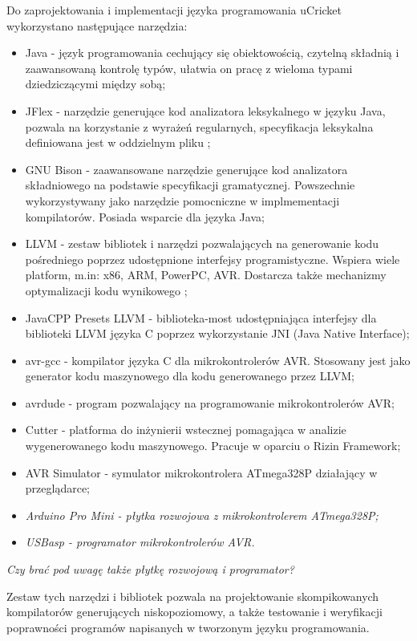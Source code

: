 Do zaprojektowania i implementacji języka programowania uCricket wykorzystano następujące narzędzia:
\begin{itemize}
\item Java - \ksremark{--} język programowania cechujący się obiektowością, czytelną składnią i zaawansowaną kontrolę typów, ułatwia on pracę z wieloma typami dziedziczącymi między sobą;
\item JFlex - narzędzie generujące kod analizatora leksykalnego w języku Java, pozwala na korzystanie z wyrażeń regularnych, specyfikacja leksykalna definiowana jest w oddzielnym pliku \cytowanie;
\item GNU Bison - zaawansowane narzędzie generujące kod analizatora składniowego na podstawie specyfikacji gramatycznej. Powszechnie wykorzystywany jako narzędzie pomocniczne w implmementacji kompilatorów. Posiada wsparcie dla języka Java;
\item LLVM - zestaw bibliotek i narzędzi pozwalających na generowanie kodu pośredniego poprzez udostępnione interfejsy programistyczne. Wspiera wiele platform, m.in: x86, ARM, PowerPC, AVR. Dostarcza także mechanizmy optymalizacji kodu wynikowego \cytowanie;
\item JavaCPP Presets LLVM - biblioteka-most udostępniająca interfejsy dla biblioteki LLVM języka C poprzez wykorzystanie JNI (Java Native Interface);
\item avr-gcc - kompilator języka C dla mikrokontrolerów AVR. Stosowany jest jako generator kodu maszynowego dla kodu generowanego przez LLVM;
\item avrdude - program pozwalający na programowanie mikrokontrolerów AVR;
\item Cutter - platforma do inżynierii wstecznej pomagająca w analizie wygenerowanego kodu maszynowego. Pracuje w oparciu o Rizin Framework;
\item AVR Simulator - symulator mikrokontrolera ATmega328P działający w przeglądarce;
\item \textit{Arduino Pro Mini - płytka rozwojowa z mikrokontrolerem ATmega328P;}
\item \textit{USBasp - programator mikrokontrolerów AVR.}
\end{itemize}

\textit{Czy brać pod uwagę także płytkę rozwojową i programator? }

Zestaw tych narzędzi i bibliotek pozwala na projektowanie skompikowanych kompilatorów generujących niskopoziomowy, a także testowanie i weryfikacji poprawności programów napisanych w tworzonym języku programowania.


%